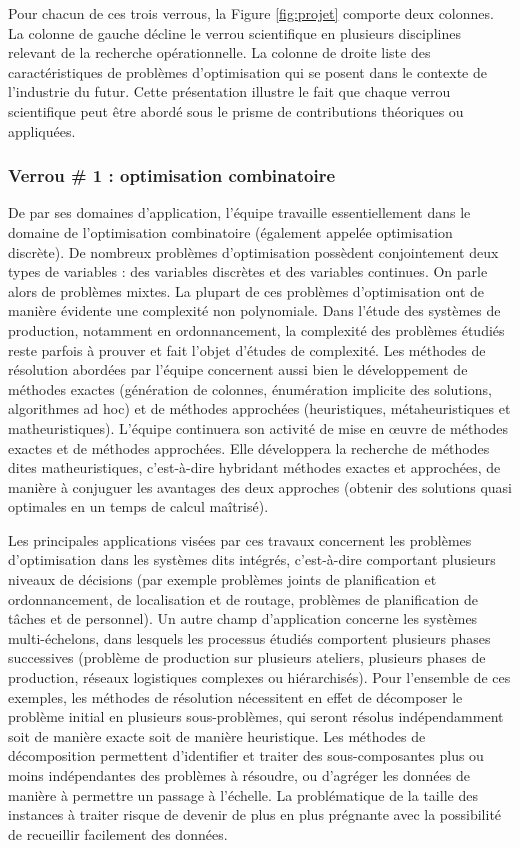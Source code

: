 	Pour chacun de ces trois verrous, la Figure \ref{fig:projet} comporte deux colonnes. La colonne de gauche décline le verrou scientifique en plusieurs disciplines relevant de la recherche opérationnelle. La colonne de droite liste des caractéristiques de problèmes d'optimisation qui se posent dans le contexte de l'industrie du futur. Cette présentation illustre le fait que chaque verrou scientifique peut être abordé sous le prisme de contributions théoriques ou appliquées. 
	
	
	\subsubsection*{Verrou \# 1 : optimisation combinatoire}
	
	De par ses domaines d'application, l'équipe travaille essentiellement dans le domaine de l'optimisation combinatoire (également appelée optimisation discrète). De nombreux problèmes d'optimisation possèdent conjointement deux types de variables : des variables discrètes et des variables continues. On parle alors de problèmes mixtes. La plupart de ces problèmes d'optimisation ont de manière évidente une complexité non polynomiale. Dans l'étude des systèmes de production, notamment en ordonnancement, la complexité des problèmes étudiés reste parfois à prouver et fait l'objet d'études de complexité. Les méthodes de résolution abordées par l'équipe concernent aussi bien le développement de méthodes exactes (génération de colonnes, énumération implicite des solutions, algorithmes ad hoc) et de méthodes approchées (heuristiques, métaheuristiques et matheuristiques). L'équipe continuera son activité de mise en {\oe}uvre de méthodes exactes et de méthodes approchées. Elle développera la recherche de méthodes dites matheuristiques, c'est-à-dire hybridant méthodes exactes et approchées, de manière à conjuguer les avantages des deux approches (obtenir des solutions quasi optimales en un temps de calcul maîtrisé).
	
	Les principales applications visées par ces travaux concernent les problèmes d'optimisation dans les systèmes dits intégrés, c'est-à-dire comportant plusieurs niveaux de décisions (par exemple problèmes joints de planification et ordonnancement, de localisation et de routage, problèmes de planification de tâches et de personnel). Un autre champ d'application concerne les systèmes multi-échelons, 
	dans lesquels les processus étudiés comportent plusieurs phases successives (problème de production sur plusieurs ateliers, plusieurs phases de production, réseaux logistiques complexes ou hiérarchisés). 
	Pour l'ensemble de ces exemples, les méthodes de résolution nécessitent en effet de décomposer le problème initial en plusieurs sous-problèmes, qui seront résolus indépendamment soit de manière exacte soit de manière heuristique.  Les méthodes de décomposition permettent d'identifier et traiter des sous-composantes plus ou moins indépendantes des problèmes à résoudre, ou d'agréger les données de manière à permettre 
	un passage à l'échelle. La problématique de la taille des instances à traiter risque de devenir de plus en plus prégnante avec la possibilité de recueillir facilement des données. 
	
